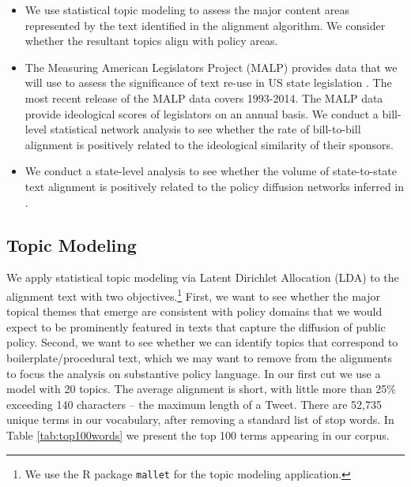 \documentclass[12pt]{article} %
\begin{document}
\begin{itemize}
\item We use statistical topic modeling to assess the major content areas represented by the text identified in the alignment algorithm. We consider whether the resultant topics align with policy areas.
\item The Measuring American Legislators Project (MALP) provides data that we will use to assess the significance of text re-use in US state legislation \citet{shor2011}. The most recent release of the MALP data covers 1993-2014. The MALP data provide ideological scores of legislators on an annual basis. We conduct a bill-level statistical network analysis to see whether the rate of bill-to-bill alignment is positively related to the ideological similarity of their sponsors.
\item We conduct a state-level analysis to see whether the volume of state-to-state text alignment is positively related to the policy diffusion networks inferred in \citet{desmarais2015}.
\end{itemize}

\subsection{Topic Modeling}

We apply statistical topic modeling via Latent Dirichlet Allocation (LDA) \citep{blei2003} to the alignment text with two objectives.\footnote{We use the R package \texttt{mallet} \citep{mallet} for the topic modeling application.} First, we want to see whether the major topical themes that emerge are consistent with policy domains that we would expect to be prominently featured in texts that capture the diffusion of public policy. Second, we want to see whether we can identify topics that correspond to boilerplate/procedural text, which we may want to remove from the alignments to focus the analysis on substantive policy language. In our first cut we use a model with 20 topics. The average alignment is short, with little more than 25\% exceeding 140 characters -- the maximum length of a Tweet. There are 52,735 unique terms in our vocabulary, after removing a standard list of stop words. In Table \ref{tab:top100words} we present the top 100 terms appearing in our corpus. 
\end{document}
